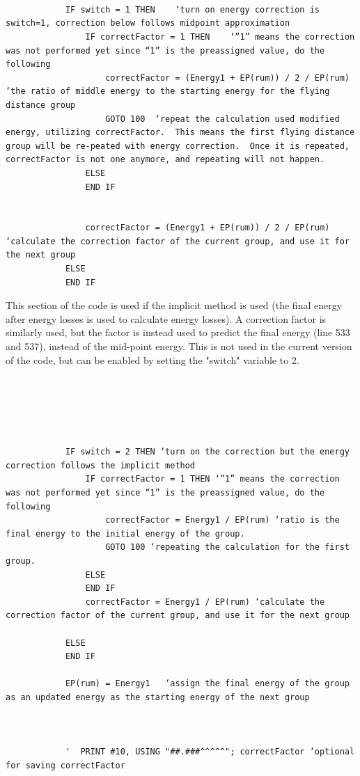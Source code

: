 \documentclass[10pt, reqno]{exam}
\begin{document}
\begin{verbatim}

    
    
            IF switch = 1 THEN    ‘turn on energy correction is switch=1, correction below follows midpoint approximation
                IF correctFactor = 1 THEN    ‘”1” means the correction was not performed yet since “1” is the preassigned value, do the following
                    correctFactor = (Energy1 + EP(rum)) / 2 / EP(rum)  ‘the ratio of middle energy to the starting energy for the flying distance group
                    GOTO 100  ‘repeat the calculation used modified energy, utilizing correctFactor.  This means the first flying distance group will be re-peated with energy correction.  Once it is repeated,  correctFactor is not one anymore, and repeating will not happen. 
                ELSE
                END IF
    
    
                correctFactor = (Energy1 + EP(rum)) / 2 / EP(rum)   ‘calculate the correction factor of the current group, and use it for the next group
            ELSE
            END IF
\end{verbatim}

This section of the code is used if the implicit method is used (the final energy after energy losses is used to calculate energy losses). A correction factor is similarly used, but the factor is instead used to predict the final energy (line 533 and 537), instead of the mid-point energy. This is not used in the current version of the code, but can be enabled by setting the "switch" variable to 2. \par

\begin{verbatim}

    
            
    
    
            IF switch = 2 THEN ‘turn on the correction but the energy correction follows the implicit method
                IF correctFactor = 1 THEN ‘”1” means the correction was not performed yet since “1” is the preassigned value, do the following
                    correctFactor = Energy1 / EP(rum) ‘ratio is the final energy to the initial energy of the group. 
                    GOTO 100 ‘repeating the calculation for the first group. 
                ELSE
                END IF
                correctFactor = Energy1 / EP(rum) ‘calculate the correction factor of the current group, and use it for the next group
    
            ELSE
            END IF
    
            EP(rum) = Energy1   ‘assign the final energy of the group as an updated energy as the starting energy of the next group 
    
    
    
            '  PRINT #10, USING "##.###^^^^^"; correctFactor ‘optional for saving correctFactor
\end{verbatim}
\end{document}
